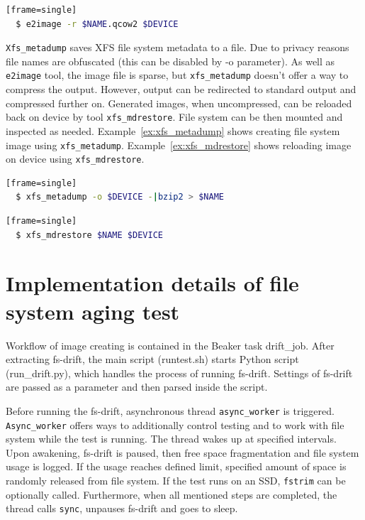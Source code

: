 \documentclass[
  color, %
  table, %
  lof,   %
  lot,   %
]{fithesis3}
\begin{document}
\begin{lstlisting}[language=bash, label={ex:e2image2}, caption={Reloading compressed image using \texttt{e2image}.}][frame=single]
  $ e2image -r $NAME.qcow2 $DEVICE
\end{lstlisting}

\texttt{Xfs\_metadump} saves XFS file system metadata to a file. Due to privacy reasons file names are obfuscated (this can be disabled by -o parameter). As well as \texttt{e2image} tool, the image file is sparse, but \texttt{xfs\_metadump} doesn't offer a way to compress the output. However, output can be redirected to standard output and compressed further on. Generated images, when uncompressed, can be reloaded back on device by tool \texttt{xfs\_mdrestore}. File system can be then mounted and inspected as needed. Example~\ref{ex:xfs_metadump} shows creating file system image using \texttt{xfs\_metadump}. Example~\ref{ex:xfs_mdrestore} shows reloading image on device using \texttt{xfs\_mdrestore}.

\begin{lstlisting}[language=bash, label={ex:xfs_metadump}, caption={Creating compressed image using \texttt{xfs\_metadump} and \texttt{bzip2}.}][frame=single]
  $ xfs_metadump -o $DEVICE -|bzip2 > $NAME
\end{lstlisting}

\begin{lstlisting}[language=bash, label={ex:xfs_mdrestore},caption={Reloading image using \texttt{xfs\_mdrestore}.}][frame=single]
  $ xfs_mdrestore $NAME $DEVICE
\end{lstlisting}

\section{Implementation details of file system aging test}
Workflow of image creating is contained in the Beaker task drift\_job. After extracting fs-drift, the main script (runtest.sh) starts Python script (run\_drift.py), which handles the process of running fs-drift. Settings of fs-drift are passed as a parameter and then parsed inside the script.

Before running the fs-drift, asynchronous thread \texttt{async\_worker} is triggered. \texttt{Async\_worker} offers ways to additionally control testing and to work with file system while the test is running. The thread wakes up at specified intervals. Upon awakening, fs-drift is paused, then free space fragmentation and file system usage is logged. If the usage reaches defined limit, specified amount of space is randomly released from file system. If the test runs on an SSD, \texttt{fstrim} can be optionally called. Furthermore, when all mentioned steps are completed, the thread calls \texttt{sync}, unpauses fs-drift and goes to sleep.
\end{document}
